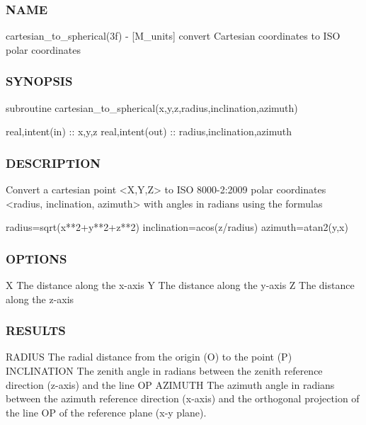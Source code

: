 \subsubsection*{N\+A\+ME}

cartesian\+\_\+to\+\_\+spherical(3f) -\/ \mbox{[}M\+\_\+units\mbox{]} convert Cartesian coordinates to I\+SO polar coordinates \subsubsection*{S\+Y\+N\+O\+P\+S\+IS}

subroutine cartesian\+\_\+to\+\_\+spherical(x,y,z,radius,inclination,azimuth)

real,intent(in) \+:\+: x,y,z real,intent(out) \+:\+: radius,inclination,azimuth

\subsubsection*{D\+E\+S\+C\+R\+I\+P\+T\+I\+ON}

\begin{DoxyVerb} Convert a cartesian point <X,Y,Z> to ISO 8000-2:2009 polar coordinates <radius,
 inclination, azimuth> with angles in radians using the formulas

   radius=sqrt(x**2+y**2+z**2)
   inclination=acos(z/radius)
   azimuth=atan2(y,x)
\end{DoxyVerb}


\subsubsection*{O\+P\+T\+I\+O\+NS}

X The distance along the x-\/axis Y The distance along the y-\/axis Z The distance along the z-\/axis

\subsubsection*{R\+E\+S\+U\+L\+TS}

\begin{DoxyVerb}RADIUS       The radial distance from the origin (O) to the point (P)
INCLINATION  The zenith angle in radians between the zenith reference direction
             (z-axis) and the line OP
AZIMUTH      The azimuth angle in radians between the azimuth reference direction
             (x-axis) and the orthogonal projection of the line OP of the
             reference plane (x-y plane).
\end{DoxyVerb}


